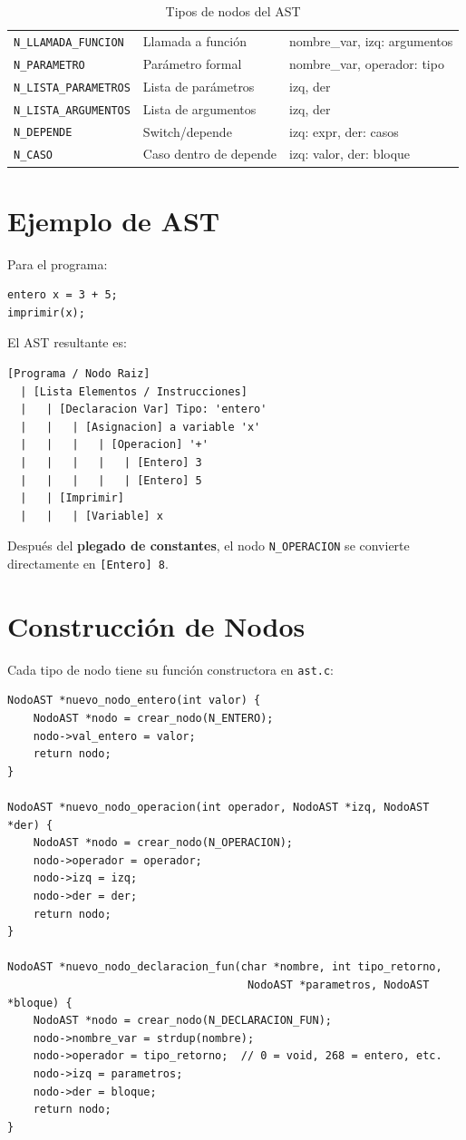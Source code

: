 \begin{table}[H]
\begin{longtable}{lp{4cm}p{7cm}}
\texttt{N\_LLAMADA\_FUNCION} & Llamada a función & nombre\_var, izq: argumentos \\
\texttt{N\_PARAMETRO} & Parámetro formal & nombre\_var, operador: tipo \\
\texttt{N\_LISTA\_PARAMETROS} & Lista de parámetros & izq, der \\
\texttt{N\_LISTA\_ARGUMENTOS} & Lista de argumentos & izq, der \\
\texttt{N\_DEPENDE} & Switch/depende & izq: expr, der: casos \\
\texttt{N\_CASO} & Caso dentro de depende & izq: valor, der: bloque \\
\end{longtable}
\caption{Tipos de nodos del AST}
\label{tab:tipos-nodo}
\end{table}

\section{Ejemplo de AST}

Para el programa:
\begin{lstlisting}[style=tppstyle]
entero x = 3 + 5;
imprimir(x);
\end{lstlisting}

El AST resultante es:
\begin{verbatim}
[Programa / Nodo Raiz]
  | [Lista Elementos / Instrucciones]
  |   | [Declaracion Var] Tipo: 'entero'
  |   |   | [Asignacion] a variable 'x'
  |   |   |   | [Operacion] '+'
  |   |   |   |   | [Entero] 3
  |   |   |   |   | [Entero] 5
  |   | [Imprimir]
  |   |   | [Variable] x
\end{verbatim}

Después del \textbf{plegado de constantes}, el nodo \texttt{N\_OPERACION} se convierte directamente en \texttt{[Entero] 8}.

\section{Construcción de Nodos}

Cada tipo de nodo tiene su función constructora en \texttt{ast.c}:

\begin{lstlisting}[style=cstyle, caption={Funciones constructoras de nodos del AST}]
NodoAST *nuevo_nodo_entero(int valor) {
    NodoAST *nodo = crear_nodo(N_ENTERO);
    nodo->val_entero = valor;
    return nodo;
}

NodoAST *nuevo_nodo_operacion(int operador, NodoAST *izq, NodoAST *der) {
    NodoAST *nodo = crear_nodo(N_OPERACION);
    nodo->operador = operador;
    nodo->izq = izq;
    nodo->der = der;
    return nodo;
}

NodoAST *nuevo_nodo_declaracion_fun(char *nombre, int tipo_retorno,
                                     NodoAST *parametros, NodoAST *bloque) {
    NodoAST *nodo = crear_nodo(N_DECLARACION_FUN);
    nodo->nombre_var = strdup(nombre);
    nodo->operador = tipo_retorno;  // 0 = void, 268 = entero, etc.
    nodo->izq = parametros;
    nodo->der = bloque;
    return nodo;
}
\end{lstlisting}
